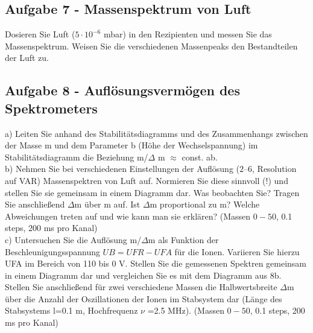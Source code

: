 \subsection*{Aufgabe 7 - Massenspektrum von Luft} 
Dosieren Sie Luft ($5 \cdot 10^{-6}$ mbar) in den Rezipienten und messen Sie das Massenspektrum. Weisen Sie die verschiedenen Massenpeaks den Bestandteilen der Luft zu. 

\subsection*{Aufgabe 8 - Auflösungsvermögen des Spektrometers} 
a) Leiten Sie anhand des Stabilitätsdiagramms und des Zusammenhangs zwischen der Masse m und dem Parameter b (Höhe der Wechselspannung) im Stabilitätsdiagramm die Beziehung m/$\Delta$ m $\approx$ const. ab.\\

b) Nehmen Sie bei verschiedenen Einstellungen der Auflösung ($2 – 6$, Resolution auf VAR) Massenspektren von Luft auf. Normieren Sie diese sinnvoll (!) und stellen Sie sie 
gemeinsam in einem Diagramm dar. Was beobachten Sie? Tragen Sie anschließend $\Delta$m über m auf. Ist $\Delta$m proportional zu m? Welche Abweichungen treten auf und wie 
kann man sie erklären? (Massen $0-50$, 0.1 steps, 200 ms pro Kanal)\\

c) Untersuchen Sie die Auflösung m/$\Delta$m als Funktion der Beschleunigungsspannung $UB = UFR - UFA$ für die Ionen. Variieren Sie hierzu UFA im Bereich von 110 bis 0 V. Stellen Sie die gemessenen Spektren gemeinsam in einem Diagramm dar und vergleichen Sie es mit dem Diagramm aus 8b. Stellen Sie anschließend für zwei verschiedene Massen die Halbwertsbreite $\Delta$m über die Anzahl der Oszillationen der Ionen im Stabsystem dar (Länge des Stabsystems l=0.1 m, Hochfrequenz $\nu$ =2.5 MHz). (Massen $0-50$, 0.1 steps, 200 ms pro Kanal) 